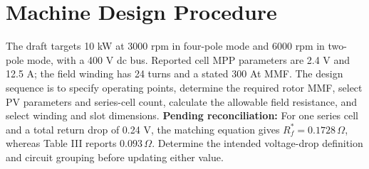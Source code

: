 \section{Machine Design Procedure}
The draft targets 10 kW at 3000 rpm in four-pole mode and 6000 rpm in two-pole mode, with a 400 V dc bus. Reported cell MPP parameters are 2.4 V and 12.5 A; the field winding has 24 turns and a stated 300 At MMF.
The design sequence is to specify operating points, determine the required rotor MMF, select PV parameters and series-cell count, calculate the allowable field resistance, and select winding and slot dimensions.
\textbf{Pending reconciliation:} For one series cell and a total return drop of 0.24 V, the matching equation gives $R_f^*=0.1728\,\Omega$, whereas Table III reports $0.093\,\Omega$. Determine the intended voltage-drop definition and circuit grouping before updating either value.
